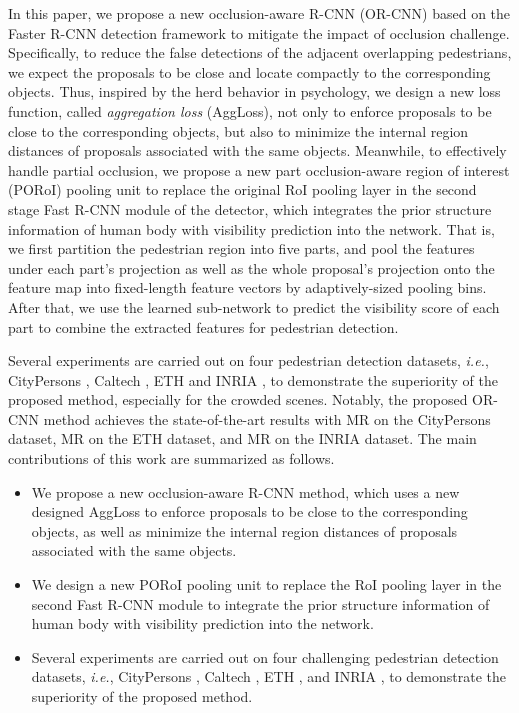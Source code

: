 \documentclass[runningheads]{llncs}
\def\ie{{\em i.e.}}
\begin{document}
In this paper, we propose a new occlusion-aware R-CNN (OR-CNN) based on the Faster R-CNN detection framework \cite{DBLP:journals/pami/RenHG017} to mitigate the impact of occlusion challenge. Specifically, to reduce the false detections of the adjacent overlapping pedestrians, we expect the proposals to be close and locate compactly to the corresponding objects. Thus, inspired by the herd behavior in psychology, we design a new loss function, called {\em aggregation loss} (AggLoss), not only to enforce proposals to be close to the corresponding objects, but also to minimize the internal region distances of proposals associated with the same objects. Meanwhile, to effectively handle partial occlusion, we propose a new part occlusion-aware region of interest (PORoI) pooling unit to replace the original RoI pooling layer in the second stage Fast R-CNN module of the detector, which integrates the prior structure information of human body with visibility prediction into the network. That is, we first partition the pedestrian region into five parts, and pool the features under each part's projection as well as the whole proposal's projection onto the feature map into fixed-length feature vectors by adaptively-sized pooling bins. After that, we use the learned sub-network to predict the visibility score of each part to combine the extracted features for pedestrian detection.


Several experiments are carried out on four pedestrian detection datasets, \ie, CityPersons \cite{DBLP:conf/cvpr/ZhangBS17}, Caltech \cite{DBLP:journals/pami/DollarWSP12}, ETH \cite{DBLP:conf/iccv/EssLG07} and INRIA \cite{DBLP:conf/cvpr/DalalT05}, to demonstrate the superiority of the proposed method, especially for the crowded scenes. Notably, the proposed OR-CNN method achieves the state-of-the-art results with  MR on the CityPersons dataset,  MR on the ETH dataset, and  MR on the INRIA dataset. The main contributions of this work are summarized as follows.
\begin{itemize}
\item We propose a new occlusion-aware R-CNN method, which uses a new designed AggLoss to enforce proposals to be close to the corresponding objects, as well as minimize the internal region distances of proposals associated with the same objects.
\item We design a new PORoI pooling unit to replace the RoI pooling layer in the second Fast R-CNN module to integrate the prior structure information of human body with visibility prediction into the network.
\item Several experiments are carried out on four challenging pedestrian detection datasets, \ie, CityPersons \cite{DBLP:conf/cvpr/ZhangBS17}, Caltech \cite{DBLP:journals/pami/DollarWSP12}, ETH \cite{DBLP:conf/iccv/EssLG07}, and INRIA \cite{DBLP:conf/cvpr/DalalT05}, to demonstrate the superiority of the proposed method.
\end{itemize}
\end{document}
